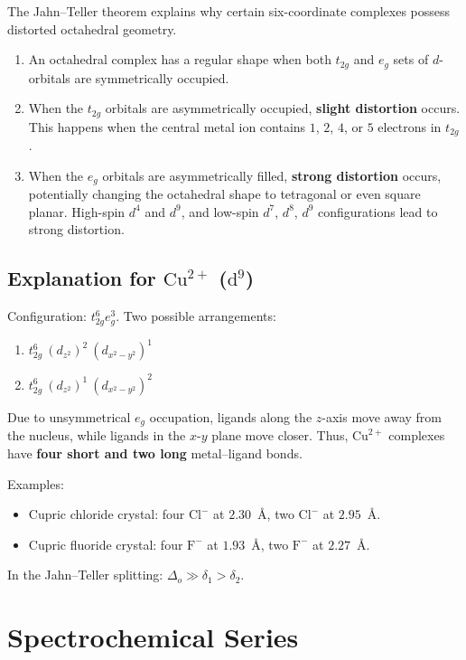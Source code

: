 \documentclass[12pt,a4paper]{article}
\begin{document}
The Jahn--Teller theorem explains why certain six-coordinate complexes possess distorted octahedral geometry.

\begin{enumerate}
  \item An octahedral complex has a regular shape when both $t_{2g}$ and $e_g$ sets of $d$-orbitals are symmetrically occupied.
  \item When the $t_{2g}$ orbitals are asymmetrically occupied, \textbf{slight distortion} occurs. This happens when the central metal ion contains $1$, $2$, $4$, or $5$ electrons in $t_{2g}$.
  \item When the $e_g$ orbitals are asymmetrically filled, \textbf{strong distortion} occurs, potentially changing the octahedral shape to tetragonal or even square planar. High-spin $d^4$ and $d^9$, and low-spin $d^7$, $d^8$, $d^9$ configurations lead to strong distortion.
\end{enumerate}

\subsection{Explanation for $\mathrm{Cu}^{2+}$ ($\mathrm{d}^9$)}

Configuration: $t_{2g}^6 e_g^3$. Two possible arrangements:
\begin{enumerate}
  \item $t_{2g}^6\ (d_{z^2})^2\ (d_{x^2-y^2})^1$
  \item $t_{2g}^6\ (d_{z^2})^1\ (d_{x^2-y^2})^2$
\end{enumerate}

Due to unsymmetrical $e_g$ occupation, ligands along the $z$-axis move away from the nucleus, while ligands in the $x$-$y$ plane move closer. Thus, $\mathrm{Cu}^{2+}$ complexes have \textbf{four short and two long} metal--ligand bonds.

Examples:
\begin{itemize}
  \item Cupric chloride crystal: four $\mathrm{Cl}^-$ at $2.30$~\AA, two $\mathrm{Cl}^-$ at $2.95$~\AA.
  \item Cupric fluoride crystal: four $\mathrm{F}^-$ at $1.93$~\AA, two $\mathrm{F}^-$ at $2.27$~\AA.
\end{itemize}

In the Jahn--Teller splitting: $\Delta_o \gg \delta_1 > \delta_2$.

\section{Spectrochemical Series}
\end{document}
